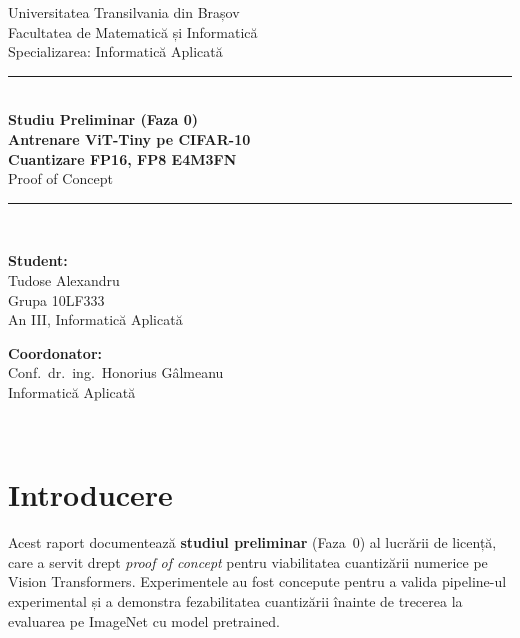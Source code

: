 \documentclass[12pt,a4paper]{article}
\begin{document}

\begin{titlepage}
  \centering
  {\large Universitatea Transilvania din Brașov\\}
  {\small Facultatea de Matematică și Informatică\\}
  {\small Specializarea: Informatică Aplicată\\[2cm]}

  \rule{\linewidth}{0.4pt}\\[0.5cm]
  {\LARGE\bfseries Studiu Preliminar (Faza 0)\\[0.3cm]}
  {\Large\bfseries Antrenare ViT-Tiny pe CIFAR-10\\[0.2cm]}
  {\Large\bfseries Cuantizare FP16, FP8 E4M3FN\\[0.2cm]}
  {\large Proof of Concept}\\[0.3cm]
  \rule{\linewidth}{0.4pt}\\[2cm]

  \begin{minipage}{0.45\textwidth}
    \textbf{Student:}\\
    Tudose Alexandru\\
    Grupa 10LF333\\
    An III, Informatică Aplicată
  \end{minipage}
  \hfill
  \begin{minipage}{0.45\textwidth}
    \raggedleft
    \textbf{Coordonator:}\\
    Conf.\ dr.\ ing.\ Honorius Gâlmeanu\\
    Informatică Aplicată
  \end{minipage}\\[3cm]

\end{titlepage}

\tableofcontents
\newpage

\section{Introducere}

Acest raport documentează \textbf{studiul preliminar} (Faza~0) al lucrării de
licență, care a servit drept \emph{proof of concept} pentru viabilitatea
cuantizării numerice pe Vision Transformers. Experimentele au fost concepute
pentru a valida pipeline-ul experimental și a demonstra fezabilitatea cuantizării
înainte de trecerea la evaluarea pe ImageNet cu model pretrained.
\end{document}
